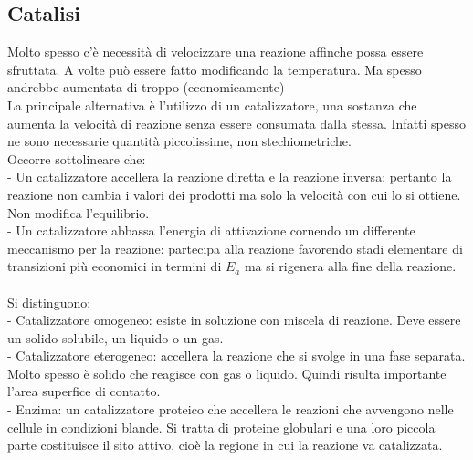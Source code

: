 \subsection{Catalisi}
Molto spesso c'è necessità di velocizzare una reazione affinche possa essere sfruttata. A volte può essere fatto modificando la temperatura. Ma spesso andrebbe aumentata di troppo (economicamente)\\
La principale alternativa è l'utilizzo di un catalizzatore, una sostanza che aumenta la velocità di reazione senza essere consumata dalla stessa. Infatti spesso ne sono necessarie quantità piccolissime, non stechiometriche.\\
Occorre sottolineare che:\\
\tab- Un catalizzatore accellera la reazione diretta e la reazione inversa: pertanto la reazione non cambia i valori dei prodotti ma solo la velocità con cui lo si ottiene. Non modifica l'equilibrio.\\
\tab- Un catalizzatore abbassa l'energia di attivazione cornendo un differente meccanismo per la reazione: partecipa alla reazione favorendo stadi elementare di transizioni più economici in termini di $E_a$ ma si rigenera alla fine della reazione.\\\\
Si distinguono:\\
\tab- Catalizzatore omogeneo: esiste in soluzione con miscela di reazione. Deve essere un solido solubile, un liquido o un gas.\\
\tab- Catalizzatore eterogeneo: accellera la reazione che si svolge in una fase separata. Molto spesso  è solido che reagisce con gas o liquido. Quindi risulta importante l'area superfice di contatto.\\
\tab- Enzima: un catalizzatore proteico che accellera le reazioni che avvengono nelle cellule in condizioni blande. Si tratta di proteine globulari e una loro piccola parte costituisce il sito attivo, cioè la regione in cui la reazione va catalizzata.\\
